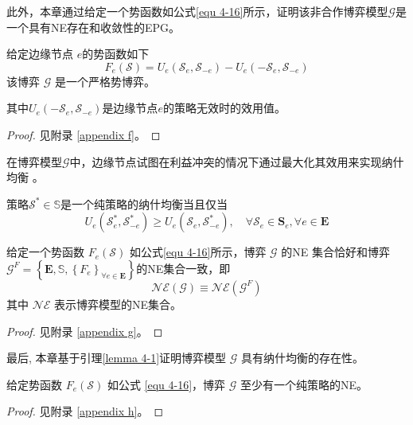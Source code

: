 此外，本章通过给定一个势函数如公式\ref{equ 4-16}所示，证明该非合作博弈模型$\mathcal{G}$是一个具有NE存在和收敛性的EPG。
\begin{theorem}
给定边缘节点 $e$的势函数如下
\begin{equation}
	{F}_{e}\left(\mathcal{S}\right) = {U}_{e}\left(\mathcal{S}_{e}, \mathcal{S}_{-e}\right) - {U}_{e}\left(-\mathcal{S}_{e}, \mathcal{S}_{-e}\right)
	\label{equ 4-16}
\end{equation}
该博弈 $\mathcal{G}$ 是一个严格势博弈。
\label{theorem 4-1}
\end{theorem}
\noindent 其中${U}_{e}\left(-\mathcal{S}_{e}, \mathcal{S}_{-e}\right)$是边缘节点$e$的策略无效时的效用值。
\begin{proof} 见附录 \ref{appendix f}。
\end{proof}
\noindent 在博弈模型$\mathcal{G}$中，边缘节点试图在利益冲突的情况下通过最大化其效用来实现纳什均衡 \cite{chew2016potential}。
\begin{definition}
策略$\mathcal{S}^{*} \in \mathbb{S}$是一个纯策略的纳什均衡\cite{chew2016potential}当且仅当
	\begin{equation}
		U_{e}\left(\mathcal{S}_{e}^{*}, \mathcal{S}_{-e}^{*}\right) \geq U_{e}\left(\mathcal{S}_{e}, \mathcal{S}_{-e}^{*}\right), \quad \forall \mathcal{S}_{e} \in \mathbf{S}_{e}, \forall e \in \mathbf{E}
	\end{equation}
\end{definition}
\begin{lemma}
	给定一个势函数 $F_{e}(\mathcal{S})$ 如公式\ref{equ 4-16}所示，博弈 $\mathcal{G}$ 的NE 集合恰好和博弈$\mathcal{G}^{F}=\left\{\mathbf{E}, \mathbb{S}, \left\{{F}_{e}\right\}_{\forall e \in \mathbf{E}} \right\}$的NE集合一致，即
	\begin{equation}
		\mathcal{NE}(\mathcal{G}) \equiv \mathcal{NE}\left(\mathcal{G}^{F}\right)
	\end{equation}
	其中 $\mathcal{NE}$ 表示博弈模型的NE集合。
\label{lemma 4-1}
\end{lemma}
\begin{proof} 见附录 \ref{appendix g}。
\end{proof}
\noindent 最后, 本章基于引理\ref{lemma 4-1}证明博弈模型 $\mathcal{G}$ 具有纳什均衡的存在性。
\begin{theorem}
	给定势函数 $F_{e}(\mathcal{S})$ 如公式 \ref{equ 4-16}，博弈 $\mathcal{G}$ 至少有一个纯策略的NE。
\label{theorem 4-2}
\end{theorem}
\begin{proof} 见附录 \ref{appendix h}。
\end{proof}
